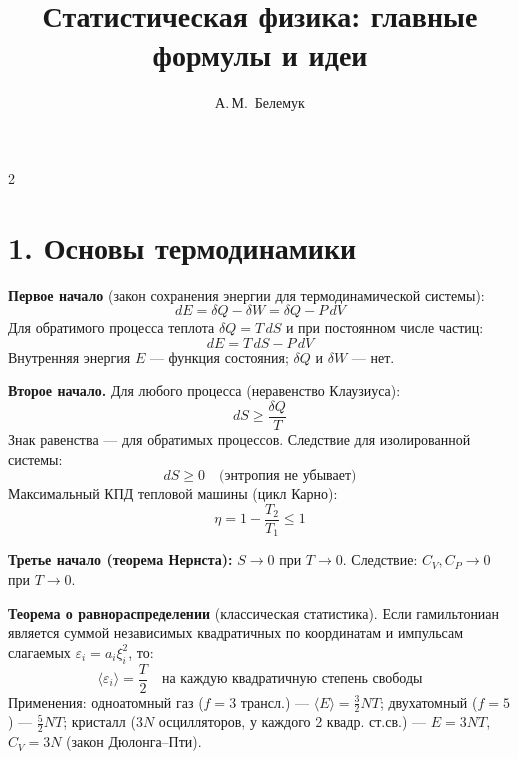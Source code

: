 \documentclass[a4paper,10pt]{article}
\title{\textbf{Статистическая физика: главные формулы и идеи}}
\author{А.\,М.~Белемук}
\date{}
\begin{document}
\maketitle
\thispagestyle{empty}
\vspace{-1em}
\begin{multicols}{2}

\section*{1. Основы термодинамики}

\textbf{Первое начало} (закон сохранения энергии для термодинамической системы):
\begin{equation*}
    dE = \delta Q - \delta W = \delta Q - P\,dV
\end{equation*}
Для обратимого процесса теплота $\delta Q = T\,dS$ и при постоянном числе частиц:
\begin{equation*}
    dE = T\,dS - P\,dV
\end{equation*}
Внутренняя энергия $E$ --- функция состояния; $\delta Q$ и $\delta W$ --- нет.

\smallskip
\textbf{Второе начало.} Для любого процесса (неравенство Клаузиуса):
\begin{equation*}
    dS \geq \frac{\delta Q}{T}
\end{equation*}
Знак равенства --- для обратимых процессов. Следствие для изолированной системы:
\begin{equation*}
    dS \geq 0 \quad \text{(энтропия не убывает)}
\end{equation*}
Максимальный КПД тепловой машины (цикл Карно):
\begin{equation*}
    \eta = 1 - \frac{T_2}{T_1} \leq 1
\end{equation*}

\textbf{Третье начало (теорема Нернста):} $S \to 0$ при $T \to 0$. Следствие: $C_V, C_P \to 0$ при $T \to 0$.

\smallskip
\textbf{Теорема о равнораспределении} (классическая статистика). Если гамильтониан является суммой независимых квадратичных по координатам и импульсам слагаемых $\varepsilon_i = a_i \xi_i^2$, то:
\begin{equation*}
    \langle \varepsilon_i \rangle = \frac{T}{2} \quad \text{на каждую квадратичную степень свободы}
\end{equation*}
Применения: одноатомный газ ($f = 3$ трансл.) --- $\langle E \rangle = \frac{3}{2}NT$; двухатомный ($f = 5$) --- $\frac{5}{2}NT$; кристалл ($3N$ осцилляторов, у каждого 2 квадр. ст.св.) --- $E = 3NT$, $C_V = 3N$ (закон Дюлонга--Пти).


\end{multicols}
\end{document}
